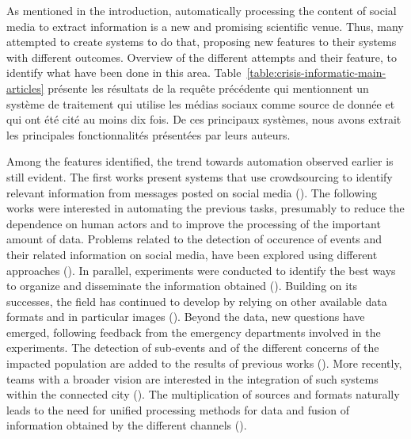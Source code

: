 As mentioned in the introduction, automatically processing the content of social media to extract information is a new and promising scientific venue.
Thus, many attempted to create systems to do that, proposing new features to their systems with different outcomes.
Overview of the different attempts and their feature, to identify what have been done in this area.
Table~\ref{table:crisis-informatic-main-articles} présente les résultats de la requête précédente qui mentionnent un système de traitement qui utilise les médias sociaux comme source de donnée et qui ont été cité au moins dix fois.
De ces principaux systèmes, nous avons extrait les principales fonctionnalités présentées par leurs auteurs.

Among the features identified, the trend towards automation observed earlier is still evident.
The first works present systems that use crowdsourcing to identify relevant information from messages posted on social media
(\cite{schulzCrisisInformationManagement2012a, backfriedOpenSourceIntelligence2012a, imranAIDRArtificialIntelligence2014b}).
The following works were interested in automating the previous tasks, presumably to reduce the dependence on human actors and to improve the processing of the important amount of data.
Problems related to the detection of occurence of events and their related information on social media, have been explored using different approaches (\cite{imranAIDRArtificialIntelligence2014b,middletonRealtimeCrisisMapping2014a,avvenutiEARSEarthquakeAlert2014a, gibsonCombiningBigSocial2014a}).
In parallel, experiments were conducted to identify the best ways to organize and disseminate the information obtained (\cite{middletonRealtimeCrisisMapping2014a,huangDisasterMapperCyberGISFramework2015a,avvenutiPullingInformationSocial2016a,grunder-fahrerTopicsTopicalPhases2018a}).
Building on its successes, the field has continued to develop by relying on other available data formats and in particular images (\cite{alamImage4ActOnlineSocial2017a,nguyenAutomaticImageFiltering2017a,agarwalCrisisDIASMultimodalDamage2020a}).
Beyond the data, new questions have emerged, following feedback from the emergency departments involved in the experiments.
The detection of sub-events and of the different concerns of the impacted population are added to the results of previous works (\cite{wuStreamExplorerMultiStageSystem2018a,raginiBigDataAnalytics2018a,grunder-fahrerTopicsTopicalPhases2018a}).
More recently, teams with a broader vision are interested in the integration of such systems within the connected city (\cite{shahDisasterResilientSmart2019a}).
The multiplication of sources and formats naturally leads to the need for unified processing methods for data and fusion of information obtained by the different channels (\cite{alamDescriptiveVisualSummaries2020a}).

